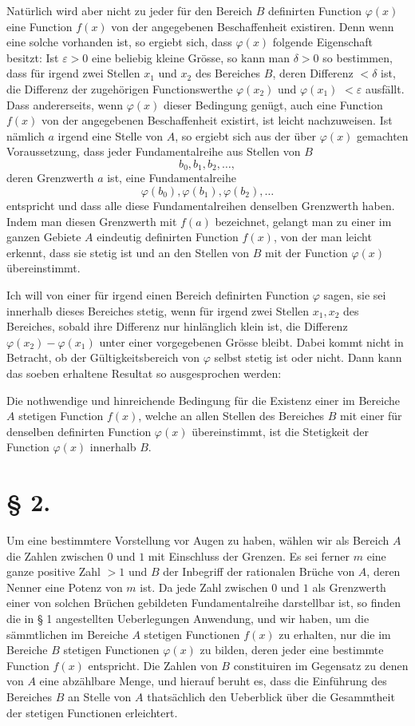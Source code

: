 \documentclass[11pt,a4paper]{article}
\begin{document}
Natürlich wird aber nicht zu jeder für den Bereich $B$ definirten Function $\varphi(x)$ eine Function $f(x)$ von der angegebenen Beschaffenheit existiren. Denn wenn eine solche vorhanden ist, so ergiebt sich, dass $\varphi(x)$ folgende Eigenschaft besitzt: Ist $\varepsilon>0$ eine beliebig kleine Grösse, so kann man $\delta>0$ so bestimmen, dass für irgend zwei Stellen $x_1$ und $x_2$ des Bereiches $B$, deren Differenz $<\delta$ ist, die Differenz der zugehörigen Functionswerthe $\varphi(x_2)$ und $\varphi(x_1)$ $<\varepsilon$ ausfällt. Dass andererseits, wenn $\varphi(x)$ dieser Bedingung genügt, auch eine Function $f(x)$ von der angegebenen Beschaffenheit existirt, ist leicht nachzuweisen. Ist nämlich $a$ irgend eine Stelle von $A$, so ergiebt sich aus der über $\varphi(x)$ gemachten Voraussetzung, dass jeder Fundamentalreihe aus Stellen von $B$
\[
 b_0,b_1,b_2,\ldots,
\]
deren Grenzwerth $a$ ist, eine Fundamentalreihe
\[
 \varphi(b_0),\varphi(b_1),\varphi(b_2),\ldots
\]
entspricht und dass alle diese Fundamentalreihen denselben Grenzwerth haben. Indem man diesen Grenzwerth mit $f(a)$ bezeichnet, gelangt man zu einer im ganzen Gebiete $A$ eindeutig definirten Function $f(x)$, von der man leicht erkennt, dass sie stetig ist und an den Stellen von $B$ mit der Function $\varphi(x)$ übereinstimmt.

Ich will von einer für irgend einen Bereich definirten Function $\varphi$ sagen, sie sei innerhalb dieses Bereiches stetig, wenn für irgend zwei Stellen $x_1,x_2$ des Bereiches, sobald ihre Differenz nur hinlänglich klein ist, die Differenz $\varphi(x_2)-\varphi(x_1)$ unter einer vorgegebenen Grösse bleibt. Dabei kommt nicht in Betracht, ob der Gültigkeitsbereich von $\varphi$ selbst stetig ist oder nicht. Dann kann das soeben erhaltene Resultat so ausgesprochen werden:

Die nothwendige und hinreichende Bedingung für die Existenz einer im Bereiche $A$ stetigen Function $f(x)$, welche an allen Stellen des Bereiches $B$ mit einer für denselben definirten Function $\varphi(x)$ übereinstimmt, ist die Stetigkeit der Function $\varphi(x)$ innerhalb $B$.

\section*{§ 2.}

Um eine bestimmtere Vorstellung vor Augen zu haben, wählen wir als Bereich $A$ die Zahlen zwischen $0$ und $1$ mit Einschluss der Grenzen. Es sei ferner $m$ eine ganze positive Zahl $>1$ und $B$ der Inbegriff der rationalen Brüche von $A$, deren Nenner eine Potenz von $m$ ist. Da jede Zahl zwischen $0$ und $1$ als Grenzwerth einer von solchen Brüchen gebildeten Fundamentalreihe darstellbar ist, so finden die in § 1 angestellten Ueberlegungen Anwendung, und wir haben, um die sämmtlichen im Bereiche $A$ stetigen Functionen $f(x)$ zu erhalten, nur die im Bereiche $B$ stetigen Functionen $\varphi(x)$ zu bilden, deren jeder eine bestimmte Function $f(x)$ entspricht. Die Zahlen von $B$ constituiren im Gegensatz zu denen von $A$ eine abzählbare Menge, und hierauf beruht es, dass die Einführung des Bereiches $B$ an Stelle von $A$ thatsächlich den Ueberblick über die Gesammtheit der stetigen Functionen erleichtert.
\end{document}
